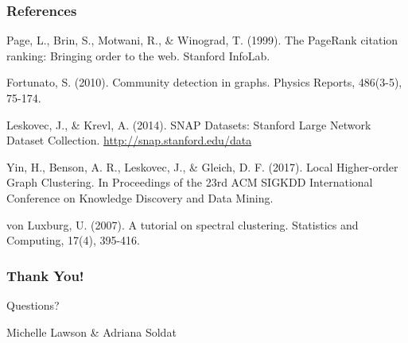\documentclass{beamer}
\begin{document}
\begin{frame}[allowframebreaks]
    \frametitle{References}
    \begin{thebibliography}{9}
     Page, L., Brin, S., Motwani, R., \& Winograd, T. (1999). The PageRank citation ranking: Bringing order to the web. Stanford InfoLab.
    
     Fortunato, S. (2010). Community detection in graphs. Physics Reports, 486(3-5), 75-174.
    
     Leskovec, J., \& Krevl, A. (2014). SNAP Datasets: Stanford Large Network Dataset Collection. \url{http://snap.stanford.edu/data}
    
     Yin, H., Benson, A. R., Leskovec, J., \& Gleich, D. F. (2017). Local Higher-order Graph Clustering. In Proceedings of the 23rd ACM SIGKDD International Conference on Knowledge Discovery and Data Mining.
    
     von Luxburg, U. (2007). A tutorial on spectral clustering. Statistics and Computing, 17(4), 395-416.
    \end{thebibliography}
\end{frame}

\begin{frame}
    \frametitle{Thank You!}
    \begin{center}
        \Huge{Questions?}
        
        \vspace{1cm}
        \large{Michelle Lawson \& Adriana Soldat}
    \end{center}
\end{frame}
\end{document}
